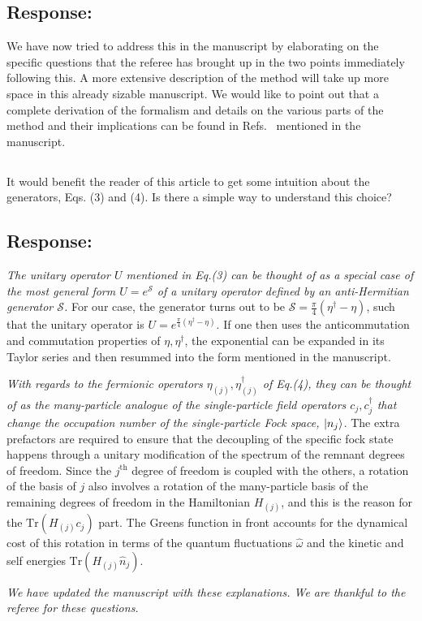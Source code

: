 \documentclass{article}
\newcommand{\response}[1]{{\color{blue}\subsection*{Response:}{#1}}}
\newcommand{\point}[1]{\subsection{}{#1}}
\begin{document}
\response{We have now tried to address this in the manuscript by elaborating on the specific questions that the referee has brought up in the two points immediately following this. A more extensive description of the method will take up more space in this already sizable manuscript. We would like to point out that a complete derivation of the formalism and details on the various parts of the method and their implications can be found in Refs.~\cite{anirbanurg1,anirbanurg2} mentioned in the manuscript.}


\point{
It would benefit the reader of this article to get some intuition about the generators, Eqs. (3) and (4). Is there a simple way to understand this choice?}

\response{
	{\it The unitary operator \(U\) mentioned in Eq.(3) can be thought of as a special case of the most general form \(U = e^\mathcal{S}\) of a unitary operator defined by an anti-Hermitian generator \(\mathcal{S}\).} For our case, the generator turns out to be \(\mathcal{S} = \frac{\pi}{4}\left( \eta^\dagger - \eta \right) \), such that the unitary operator is \(U = e^{\frac{\pi}{4}\left(\eta^\dagger - \eta\right) }\). If one then uses the anticommutation and commutation properties of \(\eta,\eta^\dagger\), the exponential can be expanded in its Taylor series and then resummed into the form mentioned in the manuscript.

	{\it With regards to the fermionic operators \(\eta_{(j)},\eta^\dagger_{(j)}\) of Eq.(4), they can be thought of as the many-particle analogue of the single-particle field operators \(c_j,c^\dagger_j\) that change the occupation number of the single-particle Fock space, \(\ket{n_j}\)}. The extra prefactors are required to ensure that the decoupling of the specific fock state happens through a unitary modification of the spectrum of the remnant degrees of freedom. Since the \(j^\text{th}\) degree of freedom is coupled with the others, a rotation of the basis of \(j\) also involves a rotation of the many-particle basis of the remaining degrees of freedom in the Hamiltonian \(H_{(j)}\), and this is the reason for the \(\text{Tr}\left(H_(j) c_j\right) \) part. The Greens function in front accounts for the dynamical cost of this rotation in terms of the quantum fluctuations \(\hat \omega\) and the kinetic and self energies \(\text{Tr}\left( H_{(j)}\hat n_j \right) \).

	{\it We have updated the manuscript with these explanations. We are thankful to the referee for these questions.}
}
\end{document}

